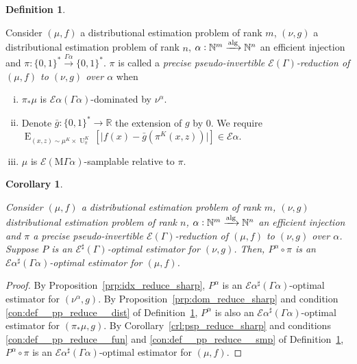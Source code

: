 \documentclass{article}
\numberwithin{equation}{section}
\theoremstyle{definition}
\newtheorem{definition}{Definition}[section]
\theoremstyle{plain}
\newtheorem{corollary}{Corollary}[section]
\newcommand{\Bool}{\{0,1\}}
\newcommand{\Words}{{\Bool^*}}
\DeclareMathOperator{\E}{E}
\DeclareMathOperator{\Un}{U}
\newcommand{\Nats}{\mathbb{N}}
\newcommand{\Reals}{\mathbb{R}}
\newcommand{\Abs}[1]{\lvert #1 \rvert}
\newcommand{\MGrow}{\mathrm{M}\Gamma}
\newcommand{\Fall}{\mathcal{E}}
\newcommand{\EG}{\Fall(\Gamma)}
\newcommand{\ESG}{\Fall^\sharp(\Gamma)}
\newcommand{\Alg}{\xrightarrow{\textnormal{alg}}}
\begin{document}
\begin{samepage}
\begin{definition}
\label{def:pp_reduce}

Consider $(\mu,f)$ a distributional estimation problem of rank ${m}$, $(\nu,g)$ a distributional estimation problem of rank ${n}$, ${\alpha: \Nats^m \Alg \Nats^n}$ an efficient injection and ${\pi: \Words \xrightarrow{\Gamma \alpha} \Words}$. $\pi$ is called a \emph{precise pseudo-invertible $\EG$-reduction of $(\mu,f)$ to $(\nu,g)$ over ${\alpha}$} when

\begin{enumerate}[(i)]

\item\label{con:def__pp_reduce__dist} ${\pi_*\mu}$ is ${\Fall \alpha(\Gamma \alpha)}$-dominated by ${\nu^\alpha}$.

\item\label{con:def__pp_reduce__fun} Denote ${\bar{g}: \Words \rightarrow \Reals}$ the extension of $g$ by 0. We require $\E_{(x,z) \sim \mu^{K} \times \Un_\pi^{K}}[\Abs{f(x)-\bar{g}(\pi^{K}(x,z))}] \in \Fall \alpha$.

\item\label{con:def__pp_reduce__smp} $\mu$ is $\Fall(\MGrow \alpha)$-samplable relative to $\pi$.

\end{enumerate}

\end{definition}
\end{samepage}

\begin{samepage}
\begin{corollary}
\label{crl:pp_reduce_sharp}

Consider $(\mu,f)$ a distributional estimation problem of rank ${m}$, $(\nu,g)$ distributional estimation problem of rank ${n}$, ${\alpha: \Nats^m \Alg \Nats^n}$ an efficient injection and $\pi$ a precise pseudo-invertible $\EG$-reduction of $(\mu, f)$ to $(\nu, g)$ over ${\alpha}$. Suppose $P$ is an $\ESG$-optimal estimator for $(\nu, g)$. Then, $P^\alpha \circ \pi$ is an $\Fall \alpha^\sharp (\Gamma \alpha)$-optimal estimator for $(\mu, f)$.

\end{corollary}
\end{samepage}

\begin{proof}

By Proposition~\ref{prp:idx_reduce_sharp}, ${P^\alpha}$ is an ${\Fall \alpha^\sharp(\Gamma \alpha)}$-optimal estimator for ${(\nu^\alpha, g)}$. By Proposition~\ref{prp:dom_reduce_sharp} and condition \ref{con:def__pp_reduce__dist} of Definition~\ref{def:pp_reduce}, ${P^\alpha}$ is also an ${\Fall \alpha^\sharp(\Gamma \alpha)}$-optimal estimator for ${(\pi_* \mu, g)}$. By Corollary~\ref{crl:psp_reduce_sharp} and conditions \ref{con:def__pp_reduce__fun} and \ref{con:def__pp_reduce__smp} of Definition~\ref{def:pp_reduce}, ${P^\alpha \circ \pi}$ is an ${\Fall \alpha^\sharp(\Gamma \alpha)}$-optimal estimator for ${(\mu, f)}$.
%
\end{proof}
\end{document}
